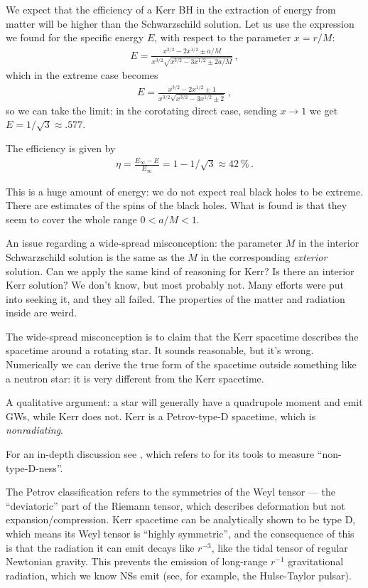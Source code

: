 \documentclass[main.tex]{subfiles}
\begin{document}
We expect that the efficiency of a Kerr BH in the extraction of energy from matter will be higher than the Schwarzschild solution. 
Let us use the expression we found for the specific energy \(E\), with respect to the parameter \(x = r/M\): 
%
\begin{align}
E = \frac{x^{3/2} - 2 x^{1/2} \pm a/M}{x^{3/2} \sqrt{x^{3/2} - 3x^{1/2} \pm 2a /M}}
\,,
\end{align}
%
which in the extreme case becomes 
%
\begin{align}
E = \frac{x^{3/2} - 2 x^{1/2} \pm 1}{x^{3/2} \sqrt{x^{3/2 }- 3 x^{1/2} \pm 2}}
\,,
\end{align}
%
so we can take the limit: in the corotating direct case, sending \(x \to 1\) we get \(E = 1 / \sqrt{3} \approx \num{.577}\). 

The efficiency is given by 
%
\begin{align}
\eta = \frac{E_\infty  - E}{E_{\infty }} = 1 - 1 / \sqrt{3} \approx \SI{42}{\percent}
\,.
\end{align}

This is a huge amount of energy: we do not expect real black holes to be extreme. 
There are estimates of the spins of the black holes. 
What is found is that they seem to cover the whole range \(0 < a/ M < 1\). 

An issue regarding a wide-spread misconception: the parameter \(M\) in the interior Schwarzschild solution is the same as the \(M\) in the corresponding \emph{exterior} solution. Can we apply the same kind of reasoning for Kerr?
Is there an interior Kerr solution? 
We don't know, but most probably not. 
Many efforts were put into seeking it, and they all failed. 
The properties of the matter and radiation inside are weird. 

The wide-spread misconception is to claim that the Kerr spacetime describes the spacetime around a rotating star. 
It sounds reasonable, but it's wrong. 
Numerically we can derive the true form of the spacetime outside something like a neutron star: it is very different from the Kerr spacetime. 

A qualitative argument: a star will generally have a quadrupole moment and emit GWs, while Kerr does not. 
Kerr is a Petrov-type-D spacetime, which is \emph{nonradiating}. 

For an in-depth discussion see \textcite[]{bertiRotatingNeutronStars2005}, which refers to \textcite[]{bakerMakingUseGeometrical2000} for its tools to measure ``non-type-D-ness''.

The Petrov classification refers to the symmetries of the Weyl tensor --- the ``deviatoric'' part of the Riemann tensor, which describes deformation but not expansion/compression. 
Kerr spacetime can be analytically shown to be type D, which means its Weyl tensor is ``highly symmetric'', and the consequence of this is that the radiation it can emit decays like \(r^{-3}\), like the tidal tensor of regular Newtonian gravity. 
This prevents the emission of long-range \(r^{-1}\) gravitational radiation, which we know NSs emit (see, for example, the Hulse-Taylor pulsar). 

\end{document}

